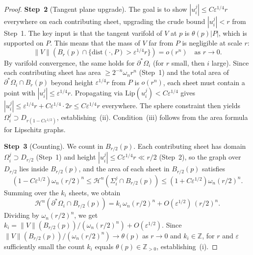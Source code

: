 \begin{proof}
\medskip\noindent\textbf{Step~2} (Tangent plane upgrade). The goal is to show $|u_i^j| \leq C\varepsilon^{1/4} r$ everywhere on each contributing sheet, upgrading the crude bound $|u_i^j| < r$ from Step~1. The key input is that the tangent varifold of $V$ at $p$ is $\theta(p)|P|$, which is supported on $P$. This means that the mass of $V$ far from $P$ is negligible at scale $r$:
\[
    \|V\|(B_r(p) \cap \{\mathrm{dist}(\cdot, P) > \varepsilon^{1/4} r\}) = o(r^n) \quad \text{as } r \to 0.
\]
By varifold convergence, the same holds for $\partial^*\Omega_i$ (for $r$ small, then $i$ large). Since each contributing sheet has area $\geq 2^{-n}\omega_n r^n$ (Step~1) and the total area of $\partial^*\Omega_i \cap B_r(p)$ beyond height $\varepsilon^{1/4} r$ from $P$ is $o(r^n)$, each sheet must contain a point with $|u_i^j| \leq \varepsilon^{1/4} r$. Propagating via $\mathrm{Lip}(u_i^j) < C\varepsilon^{1/4}$ gives $|u_i^j| \leq \varepsilon^{1/4} r + C\varepsilon^{1/4} \cdot 2r \leq C\varepsilon^{1/4} r$ everywhere. The sphere constraint then yields $\Omega_i^j \supset D_{r(1 - C\varepsilon^{1/2})}$, establishing~(ii). Condition~(iii) follows from the area formula for Lipschitz graphs.

\medskip\noindent\textbf{Step~3} (Counting). We count in $B_{r/2}(p)$. Each contributing sheet has domain $\Omega_i^j \supset D_{r/2}$ \textup{(Step~1)} and height $|u_i^j| \leq C\varepsilon^{1/4} r \ll r/2$ \textup{(Step~2)}, so the graph over $D_{r/2}$ lies inside $B_{r/2}(p)$, and the area of each sheet in $B_{r/2}(p)$ satisfies
\[
    (1 - C\varepsilon^{1/2})\omega_n (r/2)^n \leq \mathcal{H}^n(\Sigma_i^j \cap B_{r/2}(p)) \leq (1 + C\varepsilon^{1/2})\omega_n (r/2)^n.
\]
Summing over the $k_i$ sheets, we obtain
\[
    \mathcal{H}^n(\partial^*\Omega_i \cap B_{r/2}(p)) = k_i \,\omega_n (r/2)^n + O(\varepsilon^{1/2})\,(r/2)^n.
\]
Dividing by $\omega_n(r/2)^n$, we get $k_i = \|V\|(B_{r/2}(p)) / (\omega_n(r/2)^n) + O(\varepsilon^{1/2})$. Since $\|V\|(B_{r/2}(p)) / (\omega_n(r/2)^n) \to \theta(p)$ as $r \to 0$ and $k_i \in \mathbb{Z}$, for $r$ and $\varepsilon$ sufficiently small the count $k_i$ equals $\theta(p) \in \mathbb{Z}_{>0}$, establishing~(i).
\end{proof}


